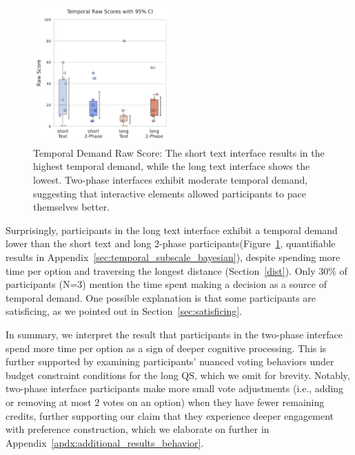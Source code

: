 \begin{figure}[h]
    \centering
    \includegraphics[width=0.47\textwidth, trim=0 13 0 13, clip]{content/image/cog/Temporal_scores.pdf}
    \captionsetup{width=0.47\textwidth, justification=justified}
    \caption{Temporal Demand Raw Score: The short text interface results in the highest temporal demand, while the long text interface shows the lowest. Two-phase interfaces exhibit moderate temporal demand, suggesting that interactive elements allowed participants to pace themselves better.}
    \label{fig:temporal_cog_score}
\end{figure}

Surprisingly, participants in the long text interface exhibit a temporal demand lower than the short text and long 2-phase participants(Figure~\ref{fig:temporal_cog_score}, quantifiable results in Appendix~\ref{sec:temporal_subscale_bayesian}), despite spending more time per option and traversing the longest distance (Section~\ref{dist}). Only 30\% of participants (N=3) mention the time spent making a decision as a source of temporal demand. One possible explanation is that some participants are satisficing, as we pointed out in Section~\ref{sec:satisficing}.  

In summary, we interpret the result that participants in the two-phase interface spend more time per option as a sign of deeper cognitive processing. This is further supported by examining participants' nuanced voting behaviors under budget constraint conditions for the long QS, which we omit for brevity. Notably, two-phase interface participants make more small vote adjustments (i.e., adding or removing at most 2 votes on an option) when they have fewer remaining credits, further supporting our claim that they experience deeper engagement with preference construction, which we elaborate on further in Appendix~\ref{apdx:additional_results_behavior}.
